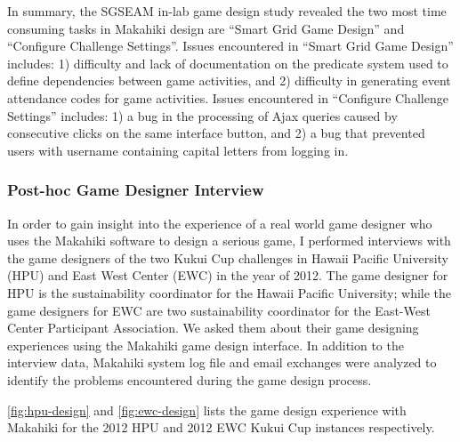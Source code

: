 In summary, the SGSEAM in-lab game design study revealed the two most time consuming tasks in  Makahiki design are ``Smart Grid Game Design'' and ``Configure Challenge Settings''. Issues encountered in ``Smart Grid Game Design'' includes: 1) difficulty and lack of documentation on the predicate system used to define dependencies between game activities, and 2) difficulty in generating event attendance codes for game activities. Issues encountered in ``Configure Challenge Settings'' includes: 1) a bug in the processing of Ajax queries caused by consecutive clicks on the same interface button, and 2) a bug that prevented users with username containing capital letters from logging in.

\subsubsection{Post-hoc Game Designer Interview}
\label{sec:designer-interview-result} 

In order to gain insight into the experience of a real world game designer who uses the Makahiki software to design a serious game, I performed interviews with the game designers of the two Kukui Cup challenges in Hawaii Pacific University (HPU) and East West Center (EWC) in the year of 2012. The game designer for HPU is the sustainability coordinator for the Hawaii Pacific University; while the game designers for EWC are two sustainability coordinator for the East-West Center Participant Association. We asked them about their game designing experiences using the Makahiki game design interface. In addition to the interview data, Makahiki system log file and email exchanges were analyzed to identify the problems encountered during the game design process.

\autoref{fig:hpu-design} and \autoref{fig:ewc-design} lists the game design experience with Makahiki for the 2012 HPU and 2012 EWC Kukui Cup instances respectively. 

